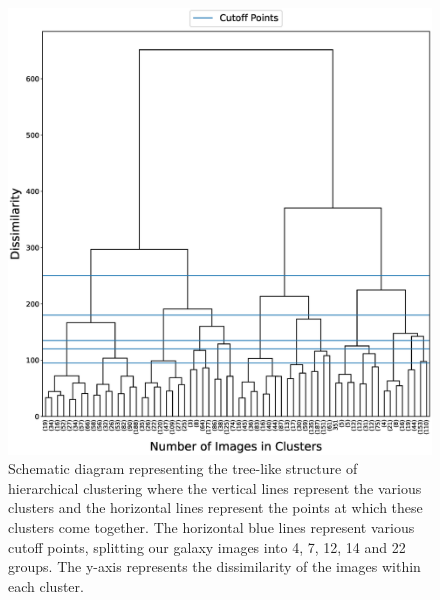 \documentclass[12pt, onecolumn]{article}
\begin{document}
        \begin{figure}[H]
            \centering
            \includegraphics[width=1\textwidth]{Images/hierarcial_clustering_dendrogram.eps}
            \caption{Schematic diagram representing the tree-like structure of hierarchical clustering where the vertical lines represent the various clusters and the horizontal lines represent the points at which these clusters come together. The horizontal blue lines represent various cutoff points, splitting our galaxy images into 4, 7, 12, 14 and 22 groups. The y-axis represents the dissimilarity of the images within each cluster.}
            \label{Dendrogram}
        \end{figure}
        
        
    
\end{document}
